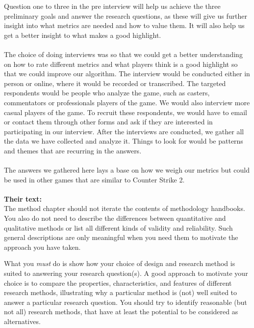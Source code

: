 \documentclass[a4paper,twoside]{bth}
\begin{document}
Question one to three in the pre interview will help us achieve the three preliminary goals and answer the research questions, as these will give us further insight into what metrics are needed and how to value them. It will also help us get a better insight to what makes a good highlight. \\\\
The choice of doing interviews was so that we could get a better understanding on how to rate different metrics and what players think is a good highlight so that we could improve our algorithm. The interview would be conducted either in person or online, where it would be recorded or transcribed. The targeted respondents would be people who analyze the game, such as casters, commentators or professionals players of the game. We would also interview more casual players of the game. To recruit these respondents, we would have to email or contact them through other forms and ask if they are interested in participating in our interview. After the interviews are conducted, we gather all the data we have collected and analyze it. Things to look for would be patterns and themes that are recurring in the answers.\\\\
The answers we gathered here lays a base on how we weigh our metrics but could be used in other games that are similar to Counter Strike 2.\\\\ 
\textbf{Their text:}\\
The method chapter should not iterate the contents of methodology handbooks. You also do not need to describe the differences between quantitative and qualitative methods or list all different kinds of validity and reliability. Such general descriptions are only meaningful when you need them to motivate the approach you have taken.

What you \emph{must} do is show how your choice of design and research method is suited to answering your research question(s). A good approach to motivate your choice is to compare the properties, characteristics, and features of different research methods, illustrating why a particular method is (not) well suited to answer a particular research question. You should try to identify reasonable (but not all) research methods, that have at least the potential to be considered as alternatives.
\end{document}
